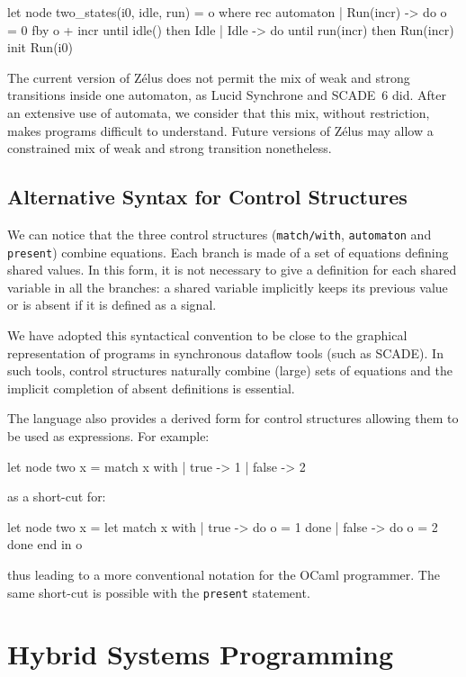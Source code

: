 \documentclass[11pt,titlepage,twoside]{report}
\newcommand{\zelus}{{\sf Z\'elus}}
\newcommand{\lucy}{{\sf Lucid Synchrone}}
\newcommand{\scade}{{\sf SCADE}}
\newcommand{\scadesix}{{\sf SCADE~6}}
\newcommand{\ocaml}{{\sf OCaml}}
\newcommand{\Remark}{\medskip\noindent{\bf Remark: }}
\begin{document}
\begin{runverbatim}[withresult]
let node two_states(i0, idle, run) = o where
  rec automaton
      | Run(incr) -> do o = 0 fby o + incr until idle() then Idle
      | Idle -> do until run(incr) then Run(incr)
      init Run(i0)
\end{runverbatim}

\Remark The current version of \zelus{} does not permit the mix of
weak and strong transitions inside one automaton, as \lucy{} and
\scadesix{} did. After an extensive use of automata, we consider that
this mix, without restriction, makes programs difficult to
understand. Future versions of \zelus{} may allow a constrained mix of
weak and strong transition nonetheless.

\section{Alternative Syntax for Control Structures}
We can notice that the three control structures (\verb+match/with+,
\verb-automaton- and \verb-present-) combine equations. Each branch is
made of a set of equations defining shared values. In this form, it
is not necessary to give a definition for each shared variable in all the
branches: a shared variable implicitly keeps its previous value or
is absent if it is defined as a signal.

We have adopted this syntactical convention to be close to the graphical
representation of programs in synchronous dataflow tools (such as
\scade). In such tools, control structures naturally combine (large) sets of
equations and the implicit completion of absent definitions is
essential.

The language also provides a derived form for control structures
allowing them to be used as expressions. For example:
%
\begin{runverbatim}
let node two x =
  match x with | true -> 1 | false -> 2
\end{runverbatim}
%
as a short-cut for:
\begin{runverbatim}
let node two x =
  let match x with
     |  true -> do o = 1 done
     | false -> do o = 2 done
     end in
  o
\end{runverbatim}
%
thus leading to a more conventional notation for the \ocaml{}
programmer. The same short-cut is possible with the \verb-present- statement.



\chapter{Hybrid Systems Programming}\label{chap:ode-programming} %
\end{document}
